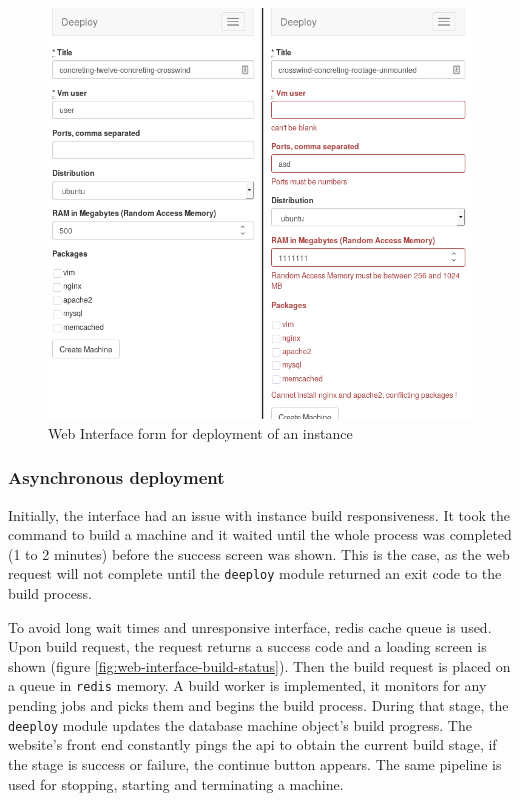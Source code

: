 \documentclass{article}
\begin{document}
\begin{figure}[h!]
	\vspace{0.5cm}
	\includegraphics[width=12cm]{valid_invalid_form.png}
	\vspace{0.5cm}
	\caption{Web Interface form for deployment of an instance}
	\label{fig:valid-invalid-form}
\end{figure}

\subsubsection{Asynchronous deployment}
Initially, the interface had an issue with instance build responsiveness. It took the command to build a machine and it waited until the whole process was completed (1 to 2 minutes) before the success screen was shown. This is the case, as the web request will not complete until the \texttt{deeploy} module returned an exit code to the build process. 

To avoid long wait times and unresponsive interface, redis cache queue is used. Upon build request, the request returns a success code and a loading screen is shown (figure \ref{fig:web-interface-build-status}). Then the build request is placed on a queue in \texttt{redis} memory. A build worker is implemented, it monitors for any pending jobs and picks them and begins the build process. During that stage, the \texttt{deeploy} module updates the database machine object's build progress. The website's front end constantly pings the \gls{api} to obtain the current build stage, if the stage is success or failure, the continue button appears. The same pipeline is used for stopping, starting and terminating a machine. 
\end{document}
